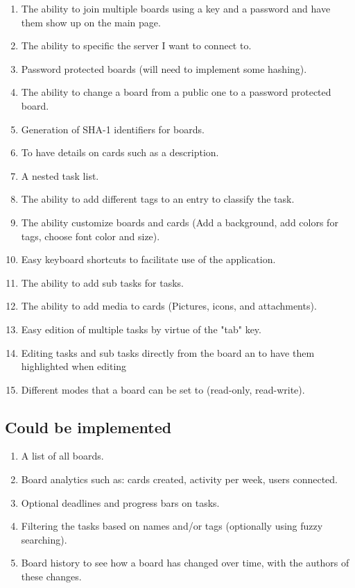 \documentclass{article}
\begin{document}
	\begin{enumerate}
		\item The ability to join multiple boards using a key and a password and have them show up on the main page.
		\item The ability to specific the server I want to connect to.
		\item Password protected boards (will need to implement some hashing).
		\item The ability to change a board from a public one to a password protected board.
		\item Generation of SHA-1 identifiers for boards.
		\item To have details on cards such as a description.
		\item A nested task list.
		\item The ability to add different tags to an entry to classify the task.
		\item The ability customize boards and cards (Add a background, add colors for tags, choose font color and size).
		\item Easy keyboard shortcuts to facilitate use of the application.
		\item The ability to add sub tasks for tasks.
		\item The ability to add media to cards (Pictures, icons, and attachments).
		\item Easy edition of multiple tasks by virtue of the "tab" key.
		\item Editing tasks and sub tasks directly from the board an to have them highlighted when editing
		\item Different modes that a board can be set to (read-only, read-write).
	\end{enumerate}

	\subsection{Could be implemented}

	\begin{enumerate}
		\item A list of all boards.
		\item Board analytics such as: cards created, activity per week, users connected.
		\item Optional deadlines and progress bars on tasks.
		\item Filtering the tasks based on names and/or tags (optionally using fuzzy searching).
		\item Board history to see how a board has changed over time, with the authors of these changes.
	\end{enumerate}
\end{document}
